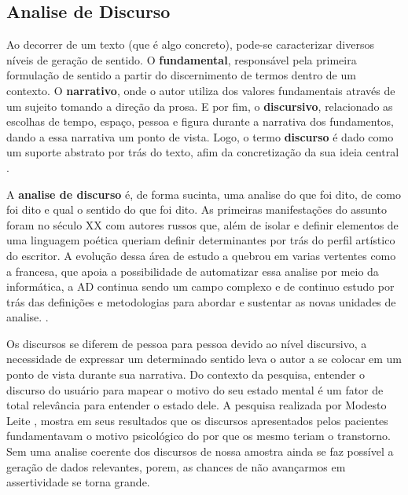 \subsection{Analise de Discurso}
Ao decorrer de um  texto (que é algo concreto), pode-se caracterizar diversos níveis de geração de sentido. O \textbf{fundamental}, responsável pela primeira formulação de sentido a partir do discernimento de termos dentro de um contexto. O \textbf{narrativo}, onde o autor utiliza dos valores fundamentais através de um sujeito tomando a direção da prosa. E por fim, o \textbf{discursivo}, relacionado as escolhas de tempo, espaço, pessoa e figura durante a narrativa dos fundamentos, dando a essa narrativa um ponto de vista. Logo, o termo \textbf{discurso} é dado como um suporte abstrato por trás do texto, afim da concretização da sua ideia central \cite[13-17]{gregolin1995ad}.

A \textbf{analise de discurso} é, de forma sucinta, uma analise do que foi dito, de como foi dito e qual o sentido do que foi dito. As primeiras manifestações do assunto foram no século XX com autores russos que, além de isolar e definir elementos de uma linguagem poética queriam definir determinantes por trás do perfil artístico do escritor. A evolução dessa área de estudo a quebrou em varias vertentes como a francesa, que apoia a possibilidade de automatizar essa analise por meio da informática, a AD continua sendo um campo complexo e de continuo estudo por trás das definições e metodologias para abordar e sustentar as novas unidades de analise. \cite[22]{souza2006ad}.

Os discursos se diferem de pessoa para pessoa devido ao nível discursivo, a necessidade de expressar um determinado sentido leva o autor a se colocar em um ponto de vista durante sua narrativa. Do contexto da pesquisa, entender o discurso do usuário para mapear o motivo do seu estado mental é um fator de total relevância para entender o estado dele. A pesquisa realizada por Modesto Leite \cite[134]{modesto2005adepre}, mostra em seus resultados que os discursos apresentados pelos pacientes fundamentavam o motivo psicológico do por que os mesmo teriam o transtorno. Sem uma analise coerente dos discursos de nossa amostra ainda se faz possível a geração de dados relevantes, porem, as chances de não avançarmos em assertividade se torna grande.
